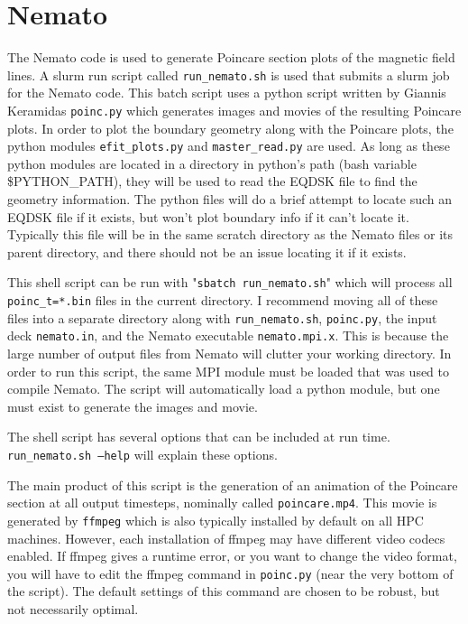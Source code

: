 \documentclass[12pt]{article}
\begin{document}
\section*{Nemato}
The Nemato code is used to generate Poincare section plots of the magnetic field lines.
A slurm run script called \texttt{run\_nemato.sh} is used that submits a slurm job for the Nemato code.
This batch script uses a python script written by Giannis Keramidas \texttt{poinc.py} which generates images and movies of the resulting Poincare plots.
In order to plot the boundary geometry along with the Poincare plots, the python modules \texttt{efit\_plots.py} and \texttt{master\_read.py} are used.
As long as these python modules are located in a directory in python's path (bash variable \$PYTHON\_PATH), they will be used to read the EQDSK file to find the geometry information.
The python files will do a brief attempt to locate such an EQDSK file if it exists, but won't plot boundary info if it can't locate it.
Typically this file will be in the same scratch directory as the Nemato files or its parent directory, and there should not be an issue locating it if it exists.

This shell script can be run with "\texttt{sbatch run\_nemato.sh}" which will process all \texttt{poinc\_t=*.bin} files in the current directory.
I recommend moving all of these files into a separate directory along with \texttt{run\_nemato.sh}, \texttt{poinc.py}, the input deck \texttt{nemato.in}, and the Nemato executable \texttt{nemato.mpi.x}.
This is because the large number of output files from Nemato will clutter your working directory.
In order to run this script, the same MPI module must be loaded that was used to compile Nemato.
The script will automatically load a python module, but one must exist to generate the images and movie.

The shell script has several options that can be included at run time.
\texttt{run\_nemato.sh --help} will explain these options.

The main product of this script is the generation of an animation of the Poincare section at all output timesteps, nominally called \texttt{poincare.mp4}.
This movie is generated by \texttt{ffmpeg} which is also typically installed by default on all HPC machines.
However, each installation of ffmpeg may have different video codecs enabled.
If ffmpeg gives a runtime error, or you want to change the video format, you will have to edit the ffmpeg command in \texttt{poinc.py} (near the very bottom of the script).
The default settings of this command are chosen to be robust, but not necessarily optimal.
\end{document}
